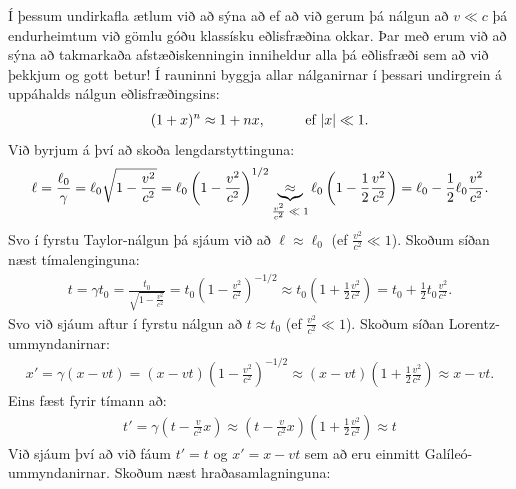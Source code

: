 Í þessum undirkafla ætlum við að sýna að ef að við gerum þá nálgun að $v \ll c$ þá endurheimtum við gömlu góðu klassísku eðlisfræðina okkar. Þar með erum við að sýna að takmarkaða afstæðiskenningin inniheldur alla þá eðlisfræði sem að við þekkjum og gott betur! Í rauninni byggja allar nálganirnar í þessari undirgrein á uppáhalds nálgun eðlisfræðingsins:
\begin{align*}
    (1 + x)^n \approx 1 + nx, \hspace{1cm} \text{ef $\abs{x} \ll 1$}.
\end{align*}
Við byrjum á því að skoða lengdarstyttinguna:
\begin{align*}
    \ell = \frac{\ell_0}{\gamma} = \ell_0 \sqrt{1 - \frac{v^2}{c^2}} = \ell_0 \left( 1 - \frac{v^2}{c^2} \right)^{1/2} \underbrace{\approx}_\textrm{$\frac{v^2}{c^2} \ll 1$} \ell_0 \left( 1 - \frac{1}{2} \frac{v^2}{c^2} \right) = \ell_0 - \frac{1}{2}\ell_0 \frac{v^2}{c^2}. 
\end{align*}
Svo í fyrstu Taylor-nálgun þá sjáum við að $\ell \approx \ell_0$ (ef $\frac{v^2}{c^2} \ll 1$). Skoðum síðan næst tímalenginguna:
\begin{align*}
    t = \gamma t_0 = \frac{t_0}{\sqrt{1 - \frac{v^2}{c^2}}} = t_0\left( 1 - \frac{v^2}{c^2} \right)^{-1/2} \approx t_0 \left( 1  + \frac{1}{2} \frac{v^2}{c^2}  \right) = t_0 + \frac{1}{2}t_0 \frac{v^2}{c^2}. 
\end{align*}
Svo við sjáum aftur í fyrstu nálgun að $t \approx t_0$ (ef $\frac{v^2}{c^2} \ll 1$). Skoðum síðan Lorentz-ummyndanirnar:
\begin{align*}
    x' = \gamma \left( x - vt \right) = \left( x - vt \right)\left(1 - \frac{v^2}{c^2} \right)^{-1/2} \approx \left( x - vt \right)\left(1 + \frac{1}{2}\frac{v^2}{c^2} \right) \approx x- vt.
\end{align*}
Eins fæst fyrir tímann að:
\begin{align*}
    t' = \gamma \left( t - \frac{v}{c^2}x \right) \approx \left(t - \frac{v}{c^2}x \right)\left( 1 + \frac{1}{2}\frac{v^2}{c^2} \right) \approx t
\end{align*}
Við sjáum því að við fáum $t' = t$ og $x' = x- vt$ sem að eru einmitt Galíleó-ummyndanirnar. Skoðum næst hraðasamlagninguna:

